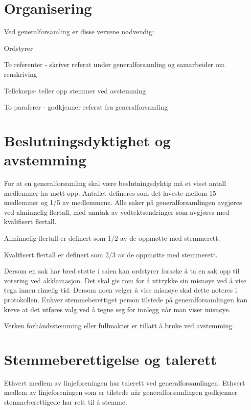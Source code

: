 \section{Organisering}
\label{sec:organisering}
Ved generalforsamling er disse vervene nødvendig: 

\begin{liste}
	\item Ordstyrer
	\item To referenter - skriver referat under generalforsamling og samarbeider om \mbox{renskriving}
	\item Tellekorps\space \space \space \space - teller opp stemmer ved avstemming
	\item To paraferer - godkjenner referat fra generalforsamling
	
\end{liste}

\newpage
\section{Beslutningsdyktighet og avstemming}

For at en generalforsamling skal være beslutningsdyktig må et visst antall medlemmer ha møtt opp. Antallet defineres som det laveste mellom 15 medlemmer og 1/5 av medlemmene. Alle saker på generalforsamlingen avgjøres ved alminnelig flertall, med unntak av vedtektsendringer som avgjøres med kvalifisert flertall.

\begin{liste}
	\item Alminnelig flertall er definert som 1/2 av de oppmøtte med stemmerett.
	\item Kvalifisert flertall er definert som 2/3 av de oppmøtte med stemmerett.
\end{liste}

Dersom en sak har bred støtte i salen kan ordstyrer forsøke å ta en sak opp til votering ved akklamasjon. Det skal gis rom for å uttrykke sin misnøye ved å vise tegn innen rimelig tid. Dersom noen velger å vise misnøye skal dette noteres i protokollen. Enhver stemmeberettiget person tilstede på generalforsamlingen kan kreve at det utføres valg ved å tegne seg for innlegg når man viser misnøye.

Verken forhåndsstemming eller fullmakter er tillatt å bruke ved avstemming.

\section{Stemmeberettigelse og talerett}
Ethvert medlem av linjeforeningen har talerett ved generalforsamlingen.\newline
Ethvert medlem av linjeforeningen som er tilstede når generalforsamlingen godkjenner stemmeberettigede har rett til å stemme.\newline

